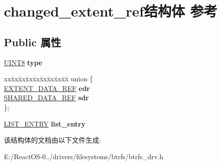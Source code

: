 \hypertarget{structchanged__extent__ref}{}\section{changed\+\_\+extent\+\_\+ref结构体 参考}
\label{structchanged__extent__ref}
\subsection*{Public 属性}
\begin{DoxyCompactItemize}
\item 
\mbox{\label{structchanged__extent__ref_a70209accaa2eb64e4bf198d3402131cd}} 
\hyperlink{_processor_bind_8h_ab27e9918b538ce9d8ca692479b375b6a}{U\+I\+N\+T8} {\bfseries type}
\item 
\mbox{\label{structchanged__extent__ref_a3cead2b238cf349a9f2e6b4747471b8a}} 
\begin{tabbing}
xx\=xx\=xx\=xx\=xx\=xx\=xx\=xx\=xx\=\kill
union \{\\
\>\hyperlink{struct_e_x_t_e_n_t___d_a_t_a___r_e_f}{EXTENT\_DATA\_REF} {\bfseries edr}\\
\>\hyperlink{struct_s_h_a_r_e_d___d_a_t_a___r_e_f}{SHARED\_DATA\_REF} {\bfseries sdr}\\
\}; \\

\end{tabbing}\item 
\mbox{\label{structchanged__extent__ref_a3ebbffaa40920c8330bf8719ba2351f3}} 
\hyperlink{struct___l_i_s_t___e_n_t_r_y}{L\+I\+S\+T\+\_\+\+E\+N\+T\+RY} {\bfseries list\+\_\+entry}
\end{DoxyCompactItemize}


该结构体的文档由以下文件生成\+:\begin{DoxyCompactItemize}
\item 
E\+:/\+React\+O\+S-\/0../drivers/filesystems/btrfs/btrfs\+\_\+drv.\+h\end{DoxyCompactItemize}
